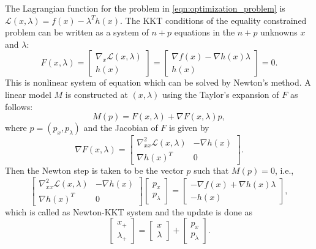 \documentclass[11pt,a4paper]{article}
\begin{document}
The Lagrangian function for the problem in \eqref{eqn:optimization_problem} is $\mathcal{L}(x,\lambda) = f(x) - \lambda^T h(x)$. The KKT conditions of the equality constrained problem can be written as a system of $n+p$ equations in the $n+p$ unknowns $x$ and $\lambda$:
\begin{equation}
F(x,\lambda) = \left[
\begin{array}{c} 
\nabla_x \mathcal{L}(x,\lambda) \\ 
h(x)
\end{array} \right]
= \left[
\begin{array}{c} 
\nabla f(x) - \nabla h(x) \lambda \\ 
h(x)
\end{array} \right] = 0.\label{eqn:original_problem_KKT}
\end{equation}
This is nonlinear system of equation which can be solved by Newton's method. A linear model $M$ is constructed at $(x,\lambda)$ using the Taylor's expansion of $F$ as follows:
\begin{equation}
M(p) = F(x,\lambda) + \nabla F(x,\lambda) p,\label{eqn:Newton_model}
\end{equation}
where $p = (p_x,p_\lambda)$ and the Jacobian of $F$ is given by
\begin{equation}
\nabla F(x,\lambda) = \left[
\begin{array}{cc} 
\nabla^2_{xx} \mathcal{L}(x,\lambda) & -\nabla h(x) \\ 
\nabla h(x)^T & 0
\end{array} \right].\label{eqn:Jacobian_of_F}
\end{equation}
Then the Newton step is taken to be the vector $p$ such that $M(p) = 0$, i.e.,
\begin{equation}
\left[
\begin{array}{cc} 
\nabla^2_{xx} \mathcal{L}(x,\lambda) & -\nabla h(x) \\ 
\nabla h(x)^T & 0
\end{array} \right]
\left[
\begin{array}{c} 
p_x \\ 
p_\lambda
\end{array} \right] = 
\left[
\begin{array}{c} 
-\nabla f(x) + \nabla h(x)\lambda \\ 
-h(x)
\end{array} \right], \label{eqn:Newton_KKT}
\end{equation}
which is called as Newton-KKT system and the update is done as
\begin{equation}
\left[
\begin{array}{c} 
x_+ \\ 
\lambda_+
\end{array} \right] = 
\left[
\begin{array}{c} 
x \\ 
\lambda
\end{array} \right] +
\left[
\begin{array}{c} 
p_x \\ 
p_\lambda
\end{array} \right].\label{eqn:Newton_update}
\end{equation}
\end{document}
